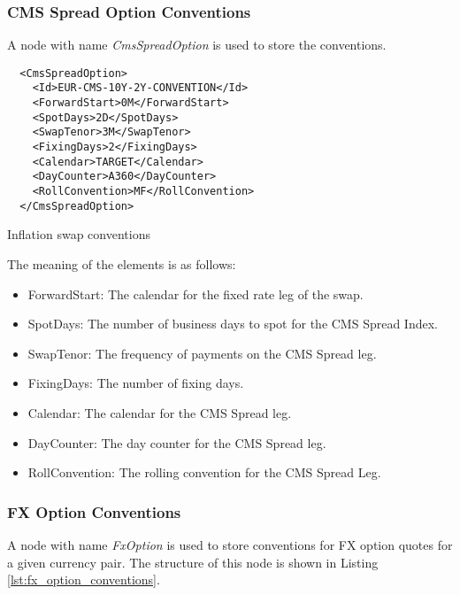 \subsubsection{CMS Spread Option Conventions}

A node with name \emph{CmsSpreadOption} is used to store the conventions.

\begin{listing}[H]
\begin{verbatim}
  <CmsSpreadOption>
    <Id>EUR-CMS-10Y-2Y-CONVENTION</Id>
    <ForwardStart>0M</ForwardStart>
    <SpotDays>2D</SpotDays>
    <SwapTenor>3M</SwapTenor>
    <FixingDays>2</FixingDays>
    <Calendar>TARGET</Calendar>
    <DayCounter>A360</DayCounter>
    <RollConvention>MF</RollConvention>
  </CmsSpreadOption>
\end{verbatim}
\caption{Inflation swap conventions}
\label{lst:cms_spread_option_conventions}
\end{listing}

The meaning of the elements is as follows:

\begin{itemize}
\item ForwardStart: The calendar for the fixed rate leg of the swap.
\item SpotDays: The number of business days to spot for the CMS Spread Index.
\item SwapTenor: The frequency of payments on the CMS Spread leg.
\item FixingDays: The number of fixing days.
\item Calendar: The calendar for the CMS Spread leg.
\item DayCounter: The day counter for the CMS Spread leg.
\item RollConvention: The rolling convention for the CMS Spread Leg.
\end{itemize}

\subsubsection{FX Option Conventions} 
A node with name \emph{FxOption} is used to store conventions for FX option quotes for a given currency pair. The 
structure of this node is shown in Listing \ref{lst:fx_option_conventions}. 
 
